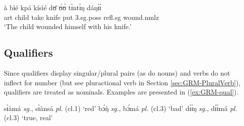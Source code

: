 \begin{exe}
\begin{exe}
\begin{exe}
{\begin{exe}
\begin{exe}
\begin{exe}
\begin{exe}
\begin{exe}
\begin{exe}
\begin{exe}
\begin{xlist}
\begin{exe}
\ex\label{ex:vp25.4.}
\gll à bìé kpá kísìé dʊ̄ ʊ̀ʊ̀ tɪ̀ntɪ̀ŋ dáŋɪ́ɪ́\\
       {\sc art} child take knife put     {\sc 3.sg.poss}   {\sc
refl.sg} wound.{\sc nmlz}\\
\glt  `The child wounded himself with his knife.' 
  
   
  \z 
 \z




\subsection{Qualifiers}
\label{sec:GRM-qualifier}

% 
%  

Since qualifiers display singular/plural pairs (as  do nouns) and verbs do not 
inflect for number (but see pluractional verb in  Section 
\ref{sec:GRM-PluralVerb}), qualifiers are treated  as  nominals. Examples are 
presented in (\ref{ex:GRM-qual}).


\ea\label{ex:GRM-qual}
 
  \ea\label{ex:GRM-qual-red}
sɪ̀àmá {\it sg.}, sɪ̀ànsá {\it pl.}   ({\sc cl.}1) `red'
  \ex\label{ex:GRM-qual-bad}
 bɔ́ŋ̀ {\it sg.}, bɔ́má {\it pl.}  ({\sc cl.}3)  `bad'
  \ex\label{ex:GRM-qual-real}
dɪ́ɪ́ŋ {\it sg.}, dɪ́ɪ́má {\it pl.} ({\sc cl.}3) `true, real' 


\end{exe}
\end{xlist}
\end{exe}
\end{exe}
\end{exe}
\end{exe}
\end{exe}
\end{exe}
\end{exe}}
\end{exe}
\end{exe}
\end{exe}
